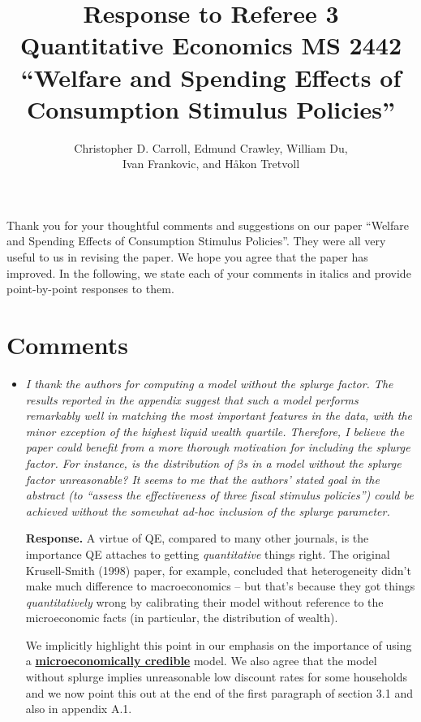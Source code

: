 \documentclass[12pt,letterpaper,english]{article}
\title{\textbf{Response to Referee 3 \\ Quantitative Economics MS 2442 \\``Welfare and Spending Effects of \\ Consumption Stimulus Policies''}}
\author{Christopher D. Carroll, Edmund Crawley, William Du, \\ Ivan Frankovic, and H\aa kon Tretvoll}
\date{}
\begin{document}
	\onehalfspacing
	\maketitle
	
	\noindent Thank you for your thoughtful comments and suggestions on our paper ``Welfare and Spending Effects of Consumption Stimulus Policies''. They were all very useful to us in revising the paper. We hope you agree that the paper has improved. In the following, we state each of your comments in italics and provide point-by-point responses to them.

	
\section{Comments}
\begin{itemize}
	
	\item \textit{I thank the authors for computing a model without the splurge factor. The results reported in the appendix suggest that such a model performs remarkably well in matching the most important features in the data, with the minor exception of the highest liquid wealth quartile. Therefore, I believe the paper could benefit from a more thorough motivation for including the splurge factor. For instance, is the distribution of $\beta$s in a model without the splurge factor unreasonable? It seems to me that the authors’ stated goal in the abstract (to ``assess the effectiveness of three fiscal stimulus policies'') could be achieved without the somewhat ad-hoc inclusion of the splurge parameter.}
	
	\noindent \textbf{Response.} A virtue of QE, compared to many other journals, is the importance QE attaches to getting \textit{quantitative} things right.  The original Krusell-Smith (1998) paper, for example, concluded that heterogeneity didn't make much difference to macroeconomics -- but that's because they got things \textit{quantitatively} wrong by calibrating their model without reference to the microeconomic facts (in particular, the distribution of wealth).
	
	We implicitly highlight this point in our emphasis on the importance of using a \href{https://llorracc.github.io/HAFiscal/#microeconomically-credible}{\textbf{microeconomically credible}} model. We also agree that the model without splurge implies unreasonable low discount rates for some households and we now point this out at the end of the first paragraph of section 3.1 and also in appendix A.1.
	

\end{itemize}
\end{document}
